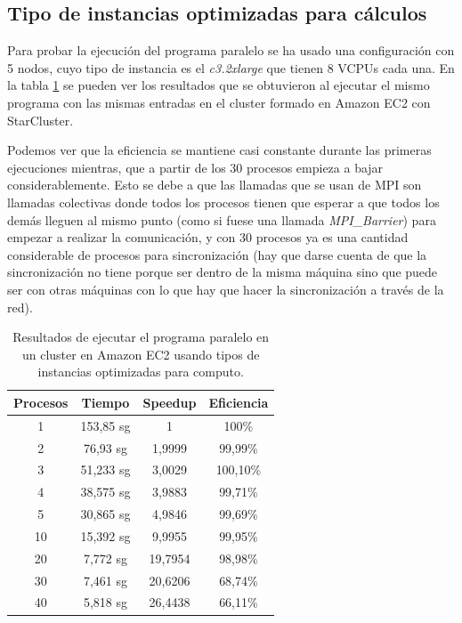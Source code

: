 \documentclass{article}
\begin{document}
\subsection{Tipo de instancias optimizadas para cálculos}\label{sec:ejC3}
	Para probar la ejecución del programa paralelo se ha usado una configuración con 5 nodos, cuyo tipo de instancia es el \emph{c3.2xlarge} que tienen 8 VCPUs cada una. En la tabla \ref{tab:resultadosClusterC} se pueden ver los resultados que se obtuvieron al ejecutar el mismo programa con las mismas entradas en el cluster formado en Amazon EC2 con StarCluster.

	Podemos ver que la eficiencia se mantiene casi constante durante las primeras ejecuciones mientras, que a partir de los 30 procesos empieza a bajar considerablemente. Esto se debe a que las llamadas que se usan de MPI son llamadas colectivas donde todos los procesos tienen que esperar a que todos los demás lleguen al mismo punto (como si fuese una llamada \emph{MPI\_Barrier}) para empezar a realizar la comunicación, y con 30 procesos ya es una cantidad considerable de procesos para sincronización (hay que darse cuenta de que la sincronización no tiene porque ser dentro de la misma máquina sino que puede ser con otras máquinas con lo que hay que hacer la sincronización a través de la red).

\begin{table}[h]
	\begin{center}
		\caption{Resultados de ejecutar el programa paralelo en un cluster en Amazon EC2 usando tipos de instancias  optimizadas para computo.}
		\begin{tabular}{|c|c|c|c|}
\hline
\textbf{Procesos} &
\textbf{Tiempo} &
\textbf{Speedup} &
\textbf{Eficiencia} \\ \hline
\hline
 1 &153,85 sg &  1          & 100\% \\ \hline
 2 & 76,93 sg &  1,9999 & 99,99\% \\ \hline 
 3 & 51,233 sg &  3,0029 & 100,10\% \\ \hline 
 4 & 38,575 sg &  3,9883 & 99,71\% \\ \hline
 5 & 30,865 sg &  4,9846 & 99,69\% \\ \hline
10 & 15,392 sg &  9,9955 & 99,95\% \\ \hline
20 & 7,772 sg & 19,7954 & 98,98\% \\ \hline
30 & 7,461 sg &  20,6206& 68,74\% \\ \hline
40 & 5,818 sg & 26,4438 & 66,11\% \\ \hline
		\end{tabular}
		\label{tab:resultadosClusterC}
	\end{center}
\end{table}
\end{document}
